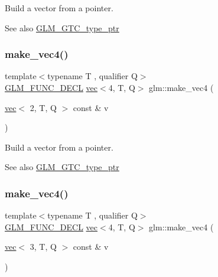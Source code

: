 Build a vector from a pointer. \begin{DoxySeeAlso}{See also}
\hyperlink{group__gtc__type__ptr}{G\+L\+M\+\_\+\+G\+T\+C\+\_\+type\+\_\+ptr} 
\end{DoxySeeAlso}
\mbox{\label{group__gtc__type__ptr_gaa9bd116caf28196fd1cf00b278286fa7}} 
\subsubsection{\texorpdfstring{make\+\_\+vec4()}{make\_vec4()}\hspace{0.1cm}{\footnotesize\ttfamily [2/5]}}
{\footnotesize\ttfamily template$<$typename T , qualifier Q$>$ \\
\hyperlink{setup_8hpp_ab2d052de21a70539923e9bcbf6e83a51}{G\+L\+M\+\_\+\+F\+U\+N\+C\+\_\+\+D\+E\+CL} \hyperlink{structglm_1_1vec}{vec}$<$4, T, Q$>$ glm\+::make\+\_\+vec4 (\begin{DoxyParamCaption}\item[{\hyperlink{structglm_1_1vec}{vec}$<$ 2, T, Q $>$ const \&}]{v }\end{DoxyParamCaption})\hspace{0.3cm}{\ttfamily [inline]}}

Build a vector from a pointer. \begin{DoxySeeAlso}{See also}
\hyperlink{group__gtc__type__ptr}{G\+L\+M\+\_\+\+G\+T\+C\+\_\+type\+\_\+ptr} 
\end{DoxySeeAlso}
\mbox{\label{group__gtc__type__ptr_ga4036328ba4702c74cbdfad1fc03d1b8f}} 
\subsubsection{\texorpdfstring{make\+\_\+vec4()}{make\_vec4()}\hspace{0.1cm}{\footnotesize\ttfamily [3/5]}}
{\footnotesize\ttfamily template$<$typename T , qualifier Q$>$ \\
\hyperlink{setup_8hpp_ab2d052de21a70539923e9bcbf6e83a51}{G\+L\+M\+\_\+\+F\+U\+N\+C\+\_\+\+D\+E\+CL} \hyperlink{structglm_1_1vec}{vec}$<$4, T, Q$>$ glm\+::make\+\_\+vec4 (\begin{DoxyParamCaption}\item[{\hyperlink{structglm_1_1vec}{vec}$<$ 3, T, Q $>$ const \&}]{v }\end{DoxyParamCaption})\hspace{0.3cm}{\ttfamily [inline]}}

